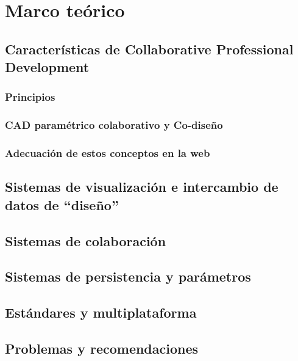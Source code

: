 \chapter{Marco teórico}
\label{chap: cap2}


\section{Características de Collaborative Professional Development
}

\subsection{Principios}


\subsection{CAD paramétrico colaborativo y Co-diseño}

\subsection{Adecuación de estos conceptos en la web}


\section{Sistemas de visualización e intercambio de datos de “diseño”
}

\section{Sistemas de colaboración}

\section{Sistemas de persistencia y parámetros
}

\section{Estándares y multiplataforma
}

\section{Problemas y recomendaciones
}
